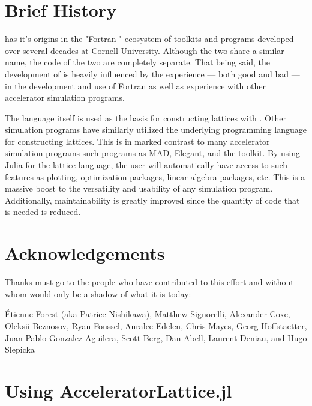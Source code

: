 \section{Brief History}

\bmadjl has it's origins in the "Fortran \bmad" ecosystem of toolkits and programs developed over several
decades at Cornell University. Although the two share a similar name, the code of the two are
completely separate. That being said, the development of \accellat is heavily influenced by the 
experience --- both good and bad --- in the development and use of Fortran \bmad as well as experience
with other accelerator simulation programs.

The \julia language itself is used as the basis for constructing lattices with \accellat. 
Other simulation programs
have similarly utilized the underlying programming language for constructing 
lattices\cite{Appleby:Merlin2020,Iadarola:Xsuite2023}. This is in marked contrast to many accelerator
simulation programs such programs as MAD\cite{Grote:MAD1989}, Elegant\cite{Borland:Elegant2000}, and the 
\bmad toolkit\cite{Sagan:Bmad2006}. 
By using Julia for the lattice language, the user will automatically have access to such features 
as plotting, optimization packages, linear algebra packages, etc. 
This is a massive boost to the versatility and usability of any \bmadjl simulation program. 
Additionally, maintainability is greatly improved since the quantity of code that is needed is reduced.

\section{Acknowledgements}

Thanks must go to the people who have contributed to this effort and without
whom \bmadjl would only be a shadow of what it is today: 

\'Etienne Forest (aka Patrice Nishikawa),
Matthew Signorelli,
Alexander Coxe,
Oleksii Beznosov,
Ryan Foussel,
Auralee Edelen,
Chris Mayes,
Georg Hoffstaetter,
Juan Pablo Gonzalez-Aguilera,
Scott Berg,
Dan Abell,
Laurent Deniau, and
Hugo Slepicka

\section{Using AcceleratorLattice.jl}

